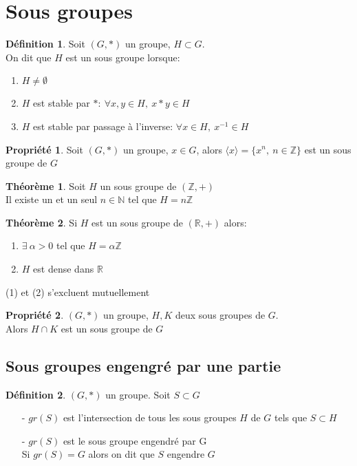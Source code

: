 \documentclass[fleqn]{article}
\theoremstyle{definition} \newtheorem*{defi}{D\'efinition}
\theoremstyle{definition} \newtheorem*{theo}{Th\'eor\`eme}
\theoremstyle{definition} \newtheorem*{coro}{Corollaire}
\theoremstyle{remark} \newtheorem*{rqs}{Remarques}
\theoremstyle{definition} \newtheorem*{prop}{Propri\'et\'e}
\begin{document}
\section{Sous groupes}
\begin{defi} Soit $(G,*)$ un groupe, $H \subset G$.\\
	On dit que $H$ est un sous groupe lorsque:
	\begin{enumerate}
		\item $H \neq \emptyset$
		\item $H$ est stable par $*:\ \forall x,y \in H,\ x*y \in H$
		\item $H$ est stable par passage \`a l'inverse: $\forall x \in H,\ x^{-1} \in H$
	\end{enumerate}
\end{defi}

\begin{prop}
	Soit $(G, *)$ un groupe, $x \in G$, alors $\langle x\rangle = \{x^n,\ n \in \mathbb{Z}\}$ est un sous groupe de $G$
\end{prop}

\begin{theo}
Soit $H$ un sous groupe de $(\mathbb{Z}, +)$ \\
Il existe un et un seul $n \in \mathbb{N}$ tel que $H = n\mathbb{Z}$
\end{theo}

\begin{theo}
	Si $H$ est un sous groupe de $(\mathbb{R}, +)$ alors:
	\begin{enumerate}
		\item $\exists\ \alpha > 0$ tel que $H = \alpha \mathbb{Z}$
		\item $H$ est dense dans $\mathbb{R}$
	\end{enumerate}
	(1) et (2) s'excluent mutuellement
\end{theo}

\begin{prop} $(G, *)$ un groupe, $H,K$ deux sous groupes de $G$.\\
Alors $H \cap K$ est un sous groupe de $G$
\end{prop}

\subsection{Sous groupes engengr\'e par une partie}
\begin{defi} $(G, *)$ un groupe. Soit $S \subset G$
	\begin{itemize}
		\item [-] $gr(S)$ est l'intersection de tous les sous groupes $H$ de $G$ tels que $S \subset H$
		\item [-] $gr(S)$ est le sous groupe engendr\'e par G\\
			Si $gr(S) = G$ alors on dit que $S$ engendre $G$
	\end{itemize}
\end{defi}
\end{document}
